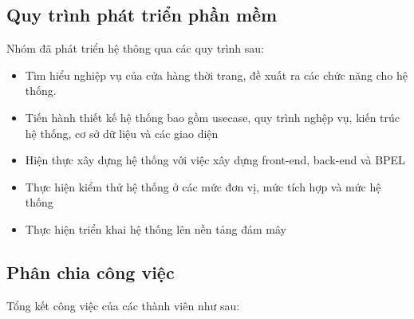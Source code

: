 \subsection{Quy trình phát triển phần mềm}
Nhóm đã phát triển hệ thông qua các quy trình sau:
\begin{itemize}
    \item Tìm hiểu nghiệp vụ của cửa hàng thời trang, đề xuất ra các chức năng cho hệ thống.
    \item Tiến hành thiết kế hệ thống bao gồm usecase, quy trình nghệp vụ, kiến trúc hệ thống, cơ sở dữ liệu và các giao diện
    \item Hiện thực xây dựng hệ thống với việc xây dựng front-end, back-end và BPEL
    \item Thực hiện kiểm thử hệ thống ở các mức đơn vị, mức tích hợp và mức hệ thống
    \item Thực hiện triển khai hệ thống lên nền tảng đám mây
\end{itemize}

\subsection{Phân chia công việc}
Tổng kết công việc của các thành viên như sau:

